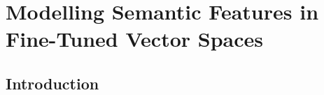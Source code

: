 \chapter{Modelling Semantic Features in Fine-Tuned Vector Spaces}\label{ch5}


\section{Introduction}





